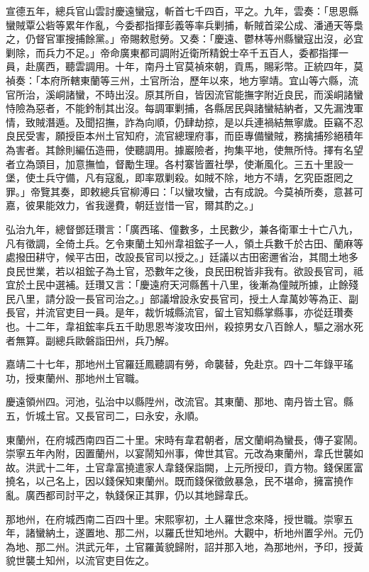 \begin{pinyinscope}
宣德五年，總兵官山雲討慶遠蠻寇，斬首七千四百，平之。九年，雲奏：「思恩縣蠻賊覃公砦等累年作亂，今委都指揮彭義等率兵剿捕，斬賊首梁公成、潘通天等梟之，仍督官軍搜捕餘黨。」帝賜敕慰勞。又奏：「慶遠、鬱林等州縣蠻寇出沒，必宜剿除，而兵力不足。」帝命廣東都司調附近衛所精銳士卒千五百人，委都指揮一員，赴廣西，聽雲調用。十年，南丹土官莫禎來朝，貢馬，賜彩幣。正統四年，莫禎奏：「本府所轄東蘭等三州，土官所治，歷年以來，地方寧靖。宜山等六縣，流官所治，溪峒諸蠻，不時出沒。原其所自，皆因流官能撫字附近良民，而溪峒諸蠻恃險為惡者，不能鈐制其出沒。每調軍剿捕，各縣居民與諸蠻結納者，又先漏洩軍情，致賊潛遁。及聞招撫，詐為向順，仍肆劫掠，是以兵連禍結無寧歲。臣竊不忍良民受害，願授臣本州土官知府，流官總理府事，而臣專備蠻賊，務擒捕殄絕積年為害者。其餘則編伍造冊，使聽調用。據巖險者，拘集平地，使無所恃。擇有名望者立為頭目，加意撫恤，督勵生理。各村寨皆置社學，使漸風化。三五十里設一堡，使土兵守備，凡有寇亂，即率眾剿殺。如賊不除，地方不靖，乞究臣誑罔之罪。」帝覽其奏，即敕總兵官柳溥曰：「以蠻攻蠻，古有成說。今莫禎所奏，意甚可嘉，彼果能效力，省我邊費，朝廷豈惜一官，爾其酌之。」

弘治九年，總督鄧廷瓚言：「廣西瑤、僮數多，土民數少，兼各衛軍士十亡八九，凡有徵調，全倚土兵。乞令東蘭土知州韋祖鋐子一人，領土兵數千於古田、蘭麻等處撥田耕守，候平古田，改設長官司以授之。」廷議以古田密邇省治，其間土地多良民世業，若以祖鋐子為土官，恐數年之後，良民田稅皆非我有。欲設長官司，祗宜於土民中選補。廷瓚又言：「慶遠府天河縣舊十八里，後漸為僮賊所據，止餘殘民八里，請分設一長官司治之。」部議增設永安長官司，授土人韋萬妙等為正、副長官，并流官吏目一員。是年，裁忻城縣流官，留土官知縣掌縣事，亦從廷瓚奏也。十二年，韋祖鋐率兵五千助思恩岑浚攻田州，殺掠男女八百餘人，驅之溺水死者無算。副總兵歐磐詣田州，兵乃解。

嘉靖二十七年，那地州土官羅廷鳳聽調有勞，命襲替，免赴京。四十二年錄平瑤功，授東蘭州、那地州土官職。

慶遠領州四。河池，弘治中以縣陞州，改流官。其東蘭、那地、南丹皆土官。縣五，忻城土官。又長官司二，曰永安，永順。

東蘭州，在府城西南四百二十里。宋時有韋君朝者，居文蘭峒為蠻長，傳子宴鬧。崇寧五年內附，因置蘭州，以宴鬧知州事，俾世其官。元改為東蘭州，韋氏世襲如故。洪武十二年，土官韋富撓遣家人韋錢保詣闕，上元所授印，貢方物。錢保匿富撓名，以己名上，因以錢保知東蘭州。既而錢保徵斂暴急，民不堪命，擁富撓作亂。廣西都司討平之，執錢保正其罪，仍以其地歸韋氏。

那地州，在府城西南二百四十里。宋熙寧初，土人羅世念來降，授世職。崇寧五年，諸蠻納土，遂置地、那二州，以羅氏世知地州。大觀中，析地州置孚州。元仍為地、那二州。洪武元年，土官羅黃貌歸附，詔并那入地，為那地州，予印，授黃貌世襲土知州，以流官吏目佐之。


\end{pinyinscope}
